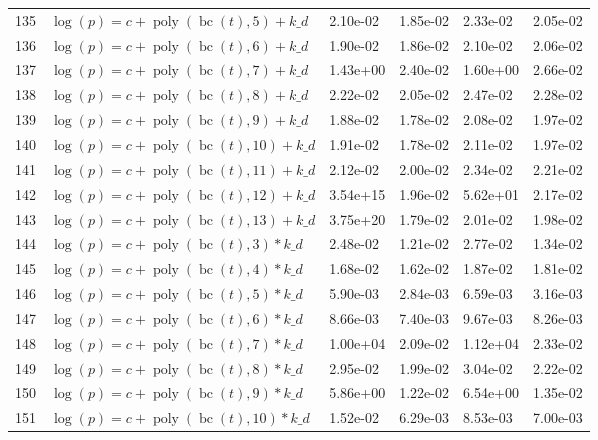 \documentclass[12pt,a4paper]{article}
\DeclareMathOperator{\bc}{bc}
\DeclareMathOperator{\poly}{poly}
\begin{document}
\begin{longtable}[t]{ll>{\raggedleft\arraybackslash}p{2cm}>{\raggedleft\arraybackslash}p{2cm}>{\raggedleft\arraybackslash}p{2cm}>{\raggedleft\arraybackslash}p{2cm}}
\rowcolor{gray!6}  135 & $\log(p) = c + \poly\left( \bc(t), 5 \right) + k\_d$ & 2.10e-02 & 1.85e-02 & 2.33e-02 & 2.05e-02\\
136 & $\log(p) = c + \poly\left( \bc(t), 6 \right) + k\_d$ & 1.90e-02 & 1.86e-02 & 2.10e-02 & 2.06e-02\\
\rowcolor{gray!6}  137 & $\log(p) = c + \poly\left( \bc(t), 7 \right) + k\_d$ & 1.43e+00 & 2.40e-02 & 1.60e+00 & 2.66e-02\\
138 & $\log(p) = c + \poly\left( \bc(t), 8 \right) + k\_d$ & 2.22e-02 & 2.05e-02 & 2.47e-02 & 2.28e-02\\
\rowcolor{gray!6}  139 & $\log(p) = c + \poly\left( \bc(t), 9 \right) + k\_d$ & 1.88e-02 & 1.78e-02 & 2.08e-02 & 1.97e-02\\
140 & $\log(p) = c + \poly\left( \bc(t), 10 \right) + k\_d$ & 1.91e-02 & 1.78e-02 & 2.11e-02 & 1.97e-02\\
\rowcolor{gray!6}  141 & $\log(p) = c + \poly\left( \bc(t), 11 \right) + k\_d$ & 2.12e-02 & 2.00e-02 & 2.34e-02 & 2.21e-02\\
142 & $\log(p) = c + \poly\left( \bc(t), 12 \right) + k\_d$ & 3.54e+15 & 1.96e-02 & 5.62e+01 & 2.17e-02\\
\rowcolor{gray!6}  143 & $\log(p) = c + \poly\left( \bc(t), 13 \right) + k\_d$ & 3.75e+20 & 1.79e-02 & 2.01e-02 & 1.98e-02\\
144 & $\log(p) = c + \poly\left( \bc(t), 3 \right) * k\_d$ & 2.48e-02 & 1.21e-02 & 2.77e-02 & 1.34e-02\\
\rowcolor{gray!6}  145 & $\log(p) = c + \poly\left( \bc(t), 4 \right) * k\_d$ & 1.68e-02 & 1.62e-02 & 1.87e-02 & 1.81e-02\\
146 & $\log(p) = c + \poly\left( \bc(t), 5 \right) * k\_d$ & 5.90e-03 & 2.84e-03 & 6.59e-03 & 3.16e-03\\
\rowcolor{gray!6}  147 & $\log(p) = c + \poly\left( \bc(t), 6 \right) * k\_d$ & 8.66e-03 & 7.40e-03 & 9.67e-03 & 8.26e-03\\
148 & $\log(p) = c + \poly\left( \bc(t), 7 \right) * k\_d$ & 1.00e+04 & 2.09e-02 & 1.12e+04 & 2.33e-02\\
\rowcolor{gray!6}  149 & $\log(p) = c + \poly\left( \bc(t), 8 \right) * k\_d$ & 2.95e-02 & 1.99e-02 & 3.04e-02 & 2.22e-02\\
150 & $\log(p) = c + \poly\left( \bc(t), 9 \right) * k\_d$ & 5.86e+00 & 1.22e-02 & 6.54e+00 & 1.35e-02\\
\rowcolor{gray!6}  151 & $\log(p) = c + \poly\left( \bc(t), 10 \right) * k\_d$ & 1.52e-02 & 6.29e-03 & 8.53e-03 & 7.00e-03\\

\end{longtable}
\end{document}
